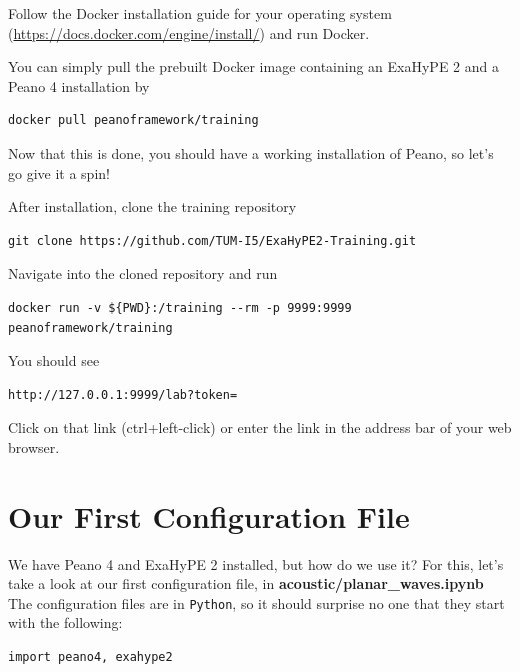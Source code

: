 \documentclass[12pt,letterpaper]{article}
\begin{document}
Follow the Docker installation guide for your operating system (\url{https://docs.docker.com/engine/install/}) and run Docker.

You can simply pull the prebuilt Docker image containing an ExaHyPE 2 and a Peano 4 installation by

\begin{lstlisting}[style = Bash]
docker pull peanoframework/training
\end{lstlisting}

Now that this is done, you should have a working installation of Peano, so let's go give it a spin!

After installation, clone the training repository

\begin{lstlisting}[style = Bash]
git clone https://github.com/TUM-I5/ExaHyPE2-Training.git
\end{lstlisting}

Navigate into the cloned repository and run

\begin{lstlisting}[style = Bash]
docker run -v ${PWD}:/training --rm -p 9999:9999 peanoframework/training
\end{lstlisting}

You should see

\begin{lstlisting}[style = Bash]
http://127.0.0.1:9999/lab?token=
\end{lstlisting}

Click on that link (ctrl+left-click) or enter the link in the address bar of your web browser.

\newpage

\section{Our First Configuration File}
\label{section_3}

We have Peano 4 and ExaHyPE 2 installed, but how do we use it? For this, let's take a look at our first configuration file, in \textbf{acoustic/planar_waves.ipynb}\\
The configuration files are in \texttt{Python}, so it should surprise no one that they start with the following:\\

\begin{lstlisting}[style = Python]
import peano4, exahype2
\end{lstlisting}
\end{document}
